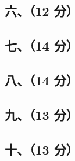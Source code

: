 \subsection{六、（12 分）}

\subsection{七、（14 分）}

\subsection{八、（14 分）}

\subsection{九、（13 分）}

\subsection{十、（13 分）}